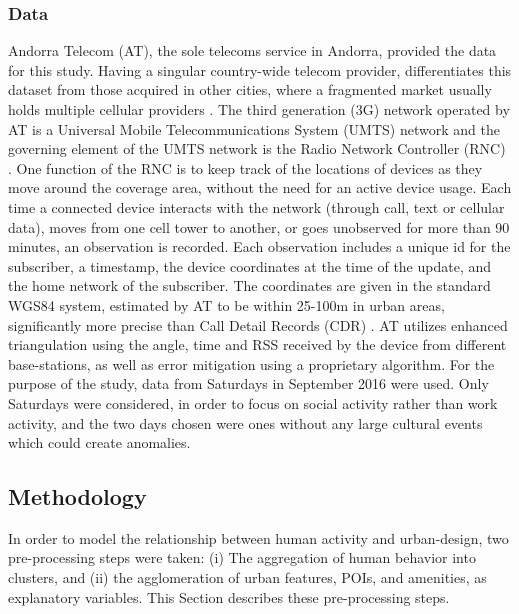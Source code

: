 {    \subsubsection{Data}
    {
        Andorra Telecom (AT), the sole telecoms service in Andorra, provided the data for this study. Having a singular country-wide telecom provider, differentiates this dataset from those acquired in other cities, where a fragmented market usually holds multiple cellular providers \cite{louail2014mobile}. The third generation (3G) network operated by AT is a Universal Mobile Telecommunications System (UMTS) network and the governing element of the UMTS network is the Radio Network Controller (RNC) \cite{ETSI}. One function of the RNC is to keep track of the locations of devices as they move around the coverage area, without the need for an active device usage. Each time a connected device interacts with the network (through call, text or cellular data), moves from one cell tower to another, or goes unobserved for more than 90 minutes, an observation is recorded. Each observation includes a unique id for the subscriber, a timestamp, the device coordinates at the time of the update, and the home network of the subscriber. The coordinates are given in the standard WGS84 system, estimated by AT to be within 25-100m in urban areas, significantly more precise than Call Detail Records (CDR) \cite{gonzalez2008understanding, Deville2014, blondel2015survey}. AT utilizes enhanced triangulation using the angle, time and RSS received by the device from different base-stations, as well as error mitigation using a proprietary algorithm. For the purpose of the study, data from Saturdays in September 2016 were used. Only Saturdays were considered, in order to focus on social activity rather than work activity, and the two days chosen were ones without any large cultural events which could create anomalies.
    }
}

\subsection{Methodology}
{
    In order to model the relationship between human activity and urban-design, two pre-processing steps were taken: (i) The aggregation of human behavior into clusters, and (ii) the agglomeration of urban features, POIs, and amenities, as explanatory variables. This Section describes these pre-processing steps.
}

